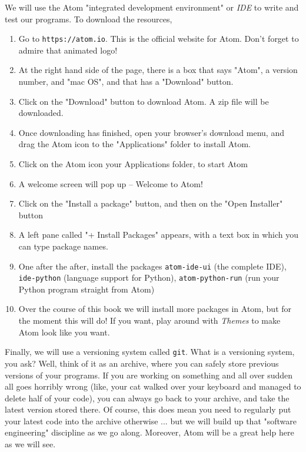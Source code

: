 We will use the Atom "integrated development environment" or \emph{IDE} to write and test our programs. To download the resources, 
\begin{enumerate} 
\item Go to \texttt{https://atom.io}. This is the official website for Atom. Don't forget to admire that animated logo! 
\item At the right hand side of the page, there is a box that says "Atom", a version number, and "mac OS", and that has a "Download" button.
\item Click on the "Download" button to download Atom. A zip file will be downloaded. 
\item Once downloading has finished, open your browser's download menu, and drag the Atom icon to the "Applications" folder to install Atom. 
\item Click on the Atom icon your Applications folder, to start Atom
\item A welcome screen will pop up -- Welcome to Atom!  
\item Click on the "Install a package" button, and then on the "Open Installer" button 
\item A left pane called "+ Install Packages" appears, with a text box in which you can type package names.  
\item One after the after, install the packages \texttt{atom-ide-ui} (the complete IDE), \texttt{ide-python} (language support for Python), \texttt{atom-python-run} (run your Python program straight from Atom) 
\item Over the course of this book we will install more packages in Atom, but for the moment this will do! If you want, play around with \emph{Themes} to make Atom look like you want.  
\end{enumerate}   

Finally, we will use a versioning system called \texttt{git}. What is a versioning system, you ask? Well, think of it as an archive, where you can safely store previous versions of your programs. If you are working on something and all over sudden all goes horribly wrong (like, your cat walked over your keyboard and managed to delete half of your code), you can always go back to your archive, and take the latest version stored there. Of course, this does mean you need to regularly put your latest code into the archive otherwise ... but we will build up that "software engineering" discipline as we go along. Moreover, Atom will be a great help here as we will see. 

